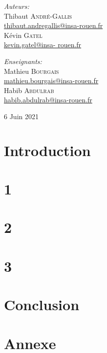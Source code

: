 \documentclass[12,french]{report}
\begin{document}
\begin{titlepage}
\begin{center}
	\begin{minipage}{0.4\textwidth}
		\begin{flushleft} \large
			\emph{Auteurs:}\\
			Thibaut \textsc{André-Gallis} \\
			{\small\href{mailto:thibaut.andregallis@insa-rouen.fr}{thibaut.andregallis@insa-rouen.fr}} \\
			Kévin \textsc{Gatel} \\
			{\small\href{mailto:kevin.gatel@insa-rouen.fr}{kevin.gatel@insa-				rouen.fr}}
		\end{flushleft}
	\end{minipage}
	\begin{minipage}{0.4\textwidth}
		\begin{flushright} \large
			\emph{Enseignants:} \\
			Mathieu \textsc{Bourgais} \\
			{\small\href{mailto:mathieu.bourgais@insa-rouen.fr}								{mathieu.bourgais@insa-rouen.fr}}\\
			Habib \textsc{Abdulrab} \\
			{\small\href{mailto:habib.abdulrab@insa-rouen.fr}{habib.abdulrab@insa-rouen.fr}}
		\end{flushright}
	\end{minipage}

	\vfill
	{\large 6 Juin 2021}
\end{center}
\end{titlepage}

\tableofcontents


\renewcommand{\chaptername}{}
\chapter*{Introduction}


\chapter{1}

\chapter{2}

\chapter{3}

\chapter*{Conclusion}

\chapter*{Annexe}
\end{document}
